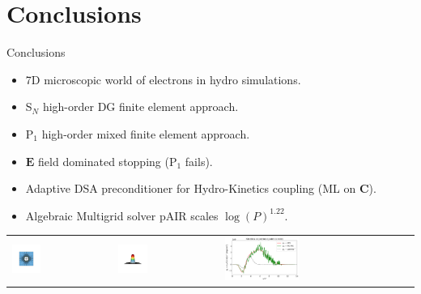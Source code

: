 \documentclass[8pt, compress]{beamer}
\newcommand{\vect}[1]{\boldsymbol{#1}}
\newcommand{\matr}[1]{\mathbf{#1}}
\newcommand{\E}{\vect{E}}
\begin{document}
\section{Conclusions}
\begin{frame}
\begin{center}
{\huge Conclusions}
\begin{itemize}
  \item 7D microscopic world of electrons in hydro simulations.
  \item S$_N$ high-order DG finite element approach.
  \item P$_1$ high-order mixed finite element approach.
  \item $\E$ field dominated stopping (P$_1$ fails).
  \item Adaptive DSA preconditioner for Hydro-Kinetics coupling (ML on $\matr{C}$).
  \item Algebraic Multigrid solver pAIR scales $\log(P)^{1.22}$.
\end{itemize}
\begin{tabular}{lll}
\includegraphics[width=0.3\textwidth]{../figures/AMR_ALE_density_2D_nobar.png} &
\includegraphics[width=0.3\textwidth]{../figures/AMR_ALE_nonlocal_Te_3D_nobar.png} &
\includegraphics[width=0.4\textwidth]{../figures/C7_Calder_case5_nonlocal_kinetics_noSNB.png}

\end{tabular}
\end{center}
\end{frame}
\end{document}
